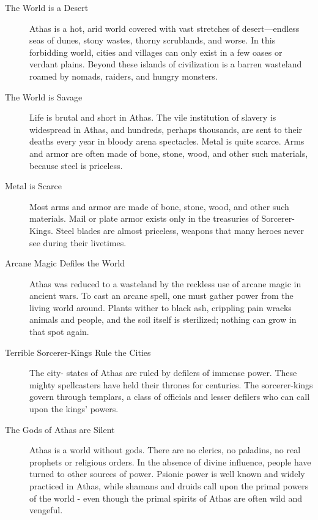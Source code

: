 \begin{description}
    \item [The World is a Desert] Athas is a hot, arid world covered with vast
        stretches of desert—endless seas of dunes, stony wastes, thorny scrublands, and worse. In this
        forbidding world, cities and villages can only exist in a few oases or verdant plains. Beyond
        these islands of civilization is a barren wasteland roamed by nomads, raiders, and hungry monsters.

    \item [The World is Savage] Life is brutal and short in Athas. The vile institution of slavery is
        widespread in Athas, and hundreds, perhaps thousands, are sent to their deaths every year in
        bloody arena spectacles. Metal is quite scarce. Arms and armor are often made of bone, stone,
        wood, and other such materials, because steel is priceless.

    \item [Metal is Scarce] Most arms and armor are made of bone, stone, wood, and other such materials.
        Mail or plate armor exists only in the treasuries of Sorcerer-Kings. Steel blades are almost
        priceless, weapons that many heroes never see during their livetimes.

    \item [Arcane Magic Defiles the World] Athas was reduced to a wasteland by the reckless use of arcane
        magic in ancient wars. To cast an arcane spell, one must gather power from the living world around.
        Plants wither to black ash, crippling pain wracks animals and people, and the soil itself is
        sterilized; nothing can grow in that spot again.

    \item [Terrible Sorcerer-Kings Rule the Cities] The city- states of Athas are ruled by defilers of
        immense power. These mighty spellcasters have held their thrones for centuries. The sorcerer-kings
        govern through templars, a class of officials and lesser defilers who can call upon the kings’ powers.

    \item [The Gods of Athas are Silent] Athas is a world without gods. There are no clerics, no paladins,
        no real prophets or religious orders. In the absence of divine influence, people have turned to
        other sources of power. Psionic power is well known and widely practiced in Athas, while shamans
        and druids call upon the primal powers of the world - even though the primal spirits of Athas are
        often wild and vengeful.


\end{description}
